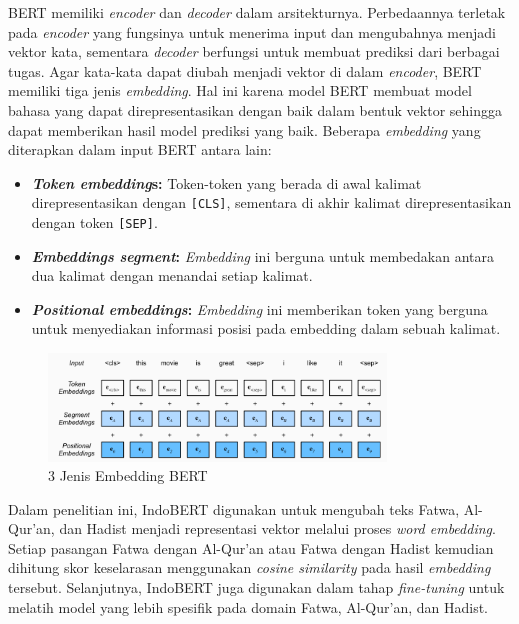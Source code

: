 \documentclass[12pt,a4paper]{article}
\begin{document}
\begin{itemize}
    BERT memiliki \textit{encoder} dan \textit{decoder} dalam arsitekturnya. Perbedaannya terletak pada \textit{encoder} yang fungsinya untuk menerima input dan mengubahnya menjadi vektor kata, sementara \textit{decoder} berfungsi untuk membuat prediksi dari berbagai tugas. Agar kata-kata dapat diubah menjadi vektor di dalam \textit{encoder}, BERT memiliki tiga jenis \textit{embedding}. Hal ini karena model BERT membuat model bahasa yang dapat direpresentasikan dengan baik dalam bentuk vektor sehingga dapat memberikan hasil model prediksi yang baik. Beberapa \textit{embedding} yang diterapkan dalam input BERT antara lain:
    \begin{itemize}
        \item \textbf{\textit{Token embedding}s:} Token-token yang berada di awal kalimat direpresentasikan dengan \texttt{[CLS]}, sementara di akhir kalimat direpresentasikan dengan token \texttt{[SEP]}.
        \item \textbf{\textit{Embeddings segment}:} \textit{Embedding }ini berguna untuk membedakan antara dua kalimat dengan menandai setiap kalimat.
        \item \textbf{\textit{Positional embeddings}:} \textit{Embedding }ini memberikan token yang berguna untuk menyediakan informasi posisi pada embedding dalam sebuah kalimat.
    \end{itemize}

    \begin{figure}[H]
        \centering
        \includegraphics[width=0.8\textwidth]{images/embedding.png}
        \caption{3 Jenis Embedding BERT}
        \label{fig:embedding}
    \end{figure}

    Dalam penelitian ini, IndoBERT digunakan untuk mengubah teks Fatwa, Al-Qur'an, dan Hadist menjadi representasi vektor melalui proses \textit{word embedding}. Setiap pasangan Fatwa dengan Al-Qur'an atau Fatwa dengan Hadist kemudian dihitung skor keselarasan menggunakan \textit{cosine similarity} pada hasil \textit{embedding} tersebut. Selanjutnya, IndoBERT juga digunakan dalam tahap \textit{fine-tuning} untuk melatih model yang lebih spesifik pada domain Fatwa, Al-Qur'an, dan Hadist.


\end{itemize}
\end{document}
